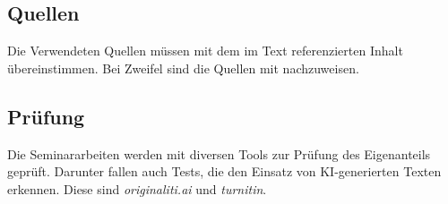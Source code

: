 \subsection{Quellen}
Die Verwendeten Quellen müssen mit dem im Text referenzierten Inhalt übereinstimmen.
Bei Zweifel sind die Quellen mit nachzuweisen.

\subsection{Prüfung}
Die Seminararbeiten werden mit diversen Tools zur Prüfung des Eigenanteils geprüft.
Darunter fallen auch Tests, die den Einsatz von KI-generierten Texten erkennen.
Diese sind \emph{originaliti.ai} und \emph{turnitin}.